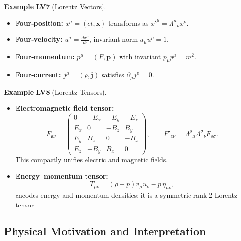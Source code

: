 \documentclass[10pt, letterpaper]{article}
\newcommand{\CustomHeading}[3]{%
  \par\medskip\noindent%
  \textbf{#1 #2} \textnormal{(#3)}.\enskip%
}
\newenvironment{EXA}[2]{\begin{unitbox}\CustomHeading{Example}{#1}{#2}}{\end{unitbox}}
\begin{document}
\begin{EXA}{LV7}{Lorentz Vectors}
\begin{itemize}
\item \textbf{Four-position:} $x^\mu = (ct, \mathbf{x})$ transforms as $x'^\mu=\Lambda^\mu{}_\nu x^\nu$.
\item \textbf{Four-velocity:} $u^\mu = \frac{dx^\mu}{d\tau}$, invariant norm $u_\mu u^\mu = 1$.
\item \textbf{Four-momentum:} $p^\mu=(E,\mathbf{p})$ with invariant $p_\mu p^\mu = m^2$.
\item \textbf{Four-current:} $j^\mu=(\rho,\mathbf{j})$ satisfies $\partial_\mu j^\mu=0$.
\end{itemize}
\end{EXA}

\begin{EXA}{LV8}{Lorentz Tensors}
\begin{itemize}
\item \textbf{Electromagnetic field tensor:}
\[
F_{\mu\nu} =
\begin{pmatrix}
0 & -E_x & -E_y & -E_z\\
E_x & 0 & -B_z & B_y\\
E_y & B_z & 0 & -B_x\\
E_z & -B_y & B_x & 0
\end{pmatrix},
\qquad
F'_{\mu\nu} = \Lambda^\rho{}_\mu \Lambda^\sigma{}_\nu F_{\rho\sigma}.
\]
This compactly unifies electric and magnetic fields.
\item \textbf{Energy–momentum tensor:}
\[
T_{\mu\nu} = (\rho + p)u_\mu u_\nu - p\,\eta_{\mu\nu},
\]
encodes energy and momentum densities; it is a symmetric rank-2 Lorentz tensor.
\end{itemize}
\end{EXA}

\subsection{Physical Motivation and Interpretation}
\end{document}
